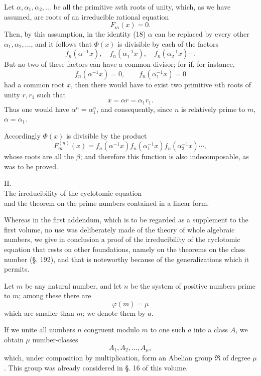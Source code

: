\documentclass[11pt]{article}
\begin{document}
Let $\alpha,\alpha_1,\alpha_2,\ldots$ be all the primitive $m$th roots of unity, which, as we have assumed, are roots of an irreducible rational equation
\[
F_m(x)=0.
\]
Then, by this assumption, in the identity (18) $\alpha$ can be replaced by every other $\alpha_1,\alpha_2,\ldots$, and it follows that $\Phi(x)$ is divisible by each of the factors
\[
f_n(\alpha^{-1}x),\quad f_n(\alpha_1^{-1}x),\quad f_n(\alpha_2^{-1}x)\cdots .
\]
But no two of these factors can have a common divisor; for if, for instance,
\[
f_n(\alpha^{-1}x)=0,
\qquad
f_n(\alpha_1^{-1}x)=0
\]
had a common root $x$, then there would have to exist two primitive $n$th roots of unity $r,r_1$ such that
\[
x=\alpha r=\alpha_1r_1.
\]
Thus one would have $\alpha^n=\alpha_1^n$, and consequently, since $n$ is relatively prime to $m$, $\alpha=\alpha_1$.

Accordingly $\Phi(x)$ is divisible by the product
\[
F_m^{(n)}(x)=f_n(\alpha^{-1}x)f_n(\alpha_1^{-1}x)f_n(\alpha_2^{-1}x)\cdots,
\]
whose roots are all the $\beta$; and therefore this function is also indecomposable, as was to be proved.

\begin{center}
{\large II.}\\[0.5em]
{\large The irreducibility of the cyclotomic equation\\
and the theorem on the prime numbers contained in a linear form.}
\end{center}

Whereas in the first addendum, which is to be regarded as a supplement to the first volume, no use was deliberately made of the theory of whole algebraic numbers, we give in conclusion a proof of the irreducibility of the cyclotomic equation that rests on other foundations, namely on the theorems on the class number (§. 192), and that is noteworthy because of the generalizations which it permits.

Let $m$ be any natural number, and let $n$ be the system of positive numbers prime to $m$; among these there are
\begin{equation}\tag{1}
\varphi(m)=\mu
\end{equation}
which are smaller than $m$; we denote them by $a$.

If we unite all numbers $n$ congruent modulo $m$ to one such $a$ into a class $A$, we obtain $\mu$ number-classes
\begin{equation}\tag{2}
A_1,A_2,\ldots,A_\mu,
\end{equation}
which, under composition by multiplication, form an Abelian group $\mathfrak R$ of degree $\mu$. This group was already considered in §. 16 of this volume.
\end{document}
